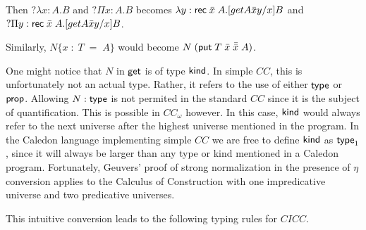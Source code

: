 Then $?\lambda x : A . B$ and $?\Pi x : A . B$ 
becomes $\lambda y : \mathsf{rec}\;\bar{x}\;A . [get A \bar{x} y / x ] B$
and $?\Pi y : \mathsf{rec}\;\bar{x}\;A . [get A \bar{x} y / x ] B$.

Similarly, $N \{ x\; : \; T \; = \;A \} $
would become $N\;( \mathsf{put} \; T \; \bar{x} \; \bar{\bar{x}} \; A)$.

One might notice that $N$ in $\mathsf{get}$ is of type $\mathsf{kind}$.  
In simple $CC$, this is unfortunately not an actual type. 
Rather, it refers to the use of either $\mathsf{type}$ or $\mathsf{prop}$.  
Allowing $N : \mathsf{type}$ is not permited in the standard $CC$ since it is the subject of quantification.
This is possible in $CC_\omega$ however.
In this case, $\mathsf{kind}$ would always refer to the next universe after the highest
universe mentioned in the program.
In the Caledon language implementing simple $CC$ we are free to define 
$\mathsf{kind}$ as $\mathsf{type}_1$, since it will always be larger than any
type or kind mentioned in a Caledon program.  
Fortunately, Geuvers' proof \citep{geuvers1993logics} of strong normalization in the presence of 
$\eta$ conversion applies to the Calculus of Construction with one impredicative universe and two predicative
universes.

This intuitive conversion leads to the following typing rules for $CICC$.

